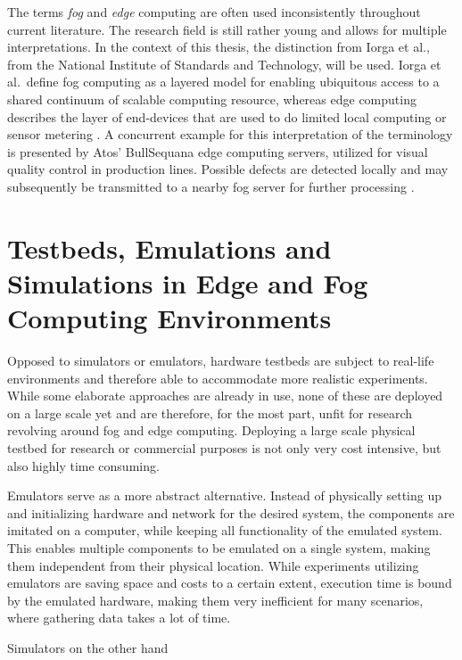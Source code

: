 The terms \emph{fog} and \emph{edge} computing are often used inconsistently
throughout current literature. The research field is still rather young and
allows for multiple interpretations. In the context of this thesis, the
distinction from Iorga et al., from the National Institute of Standards and
Technology, will be used. Iorga et al.\ define fog computing as a layered model
for enabling ubiquitous access to a shared continuum of scalable computing
resource, whereas edge computing describes the layer of end-devices that are
used to do limited local computing or sensor metering \cite{iorga2018}. A
concurrent example for this interpretation of the terminology is presented by
Atos' BullSequana edge computing servers, utilized for visual quality control in
production lines. Possible defects are detected locally and may subsequently be
transmitted to a nearby fog server for further processing \cite{atos2019,
atos2020}.

\section{Testbeds, Emulations and Simulations in Edge and Fog Computing Environments}
\label{sec:testbeds_emulations_and_simulations}

Opposed to simulators or emulators, hardware testbeds are subject to real-life
environments and therefore able to accommodate more realistic experiments. While
some elaborate approaches are already in use, none of these are deployed on a
large scale yet and are therefore, for the most part, unfit for research
revolving around fog and edge computing. Deploying a large scale physical
testbed for research or commercial purposes is not only very cost intensive, but
also highly time consuming.

Emulators serve as a more abstract alternative. Instead of physically setting up
and initializing hardware and network for the desired system, the components are
imitated on a computer, while keeping all functionality of the emulated system.
This enables multiple components to be emulated on a single system, making them
independent from their physical location. While experiments utilizing emulators
are saving space and costs to a certain extent, execution time is bound by the
emulated hardware, making them very inefficient for many scenarios, where
gathering data takes a lot of time.

Simulators on the other hand
\cite{svorobej2019}


